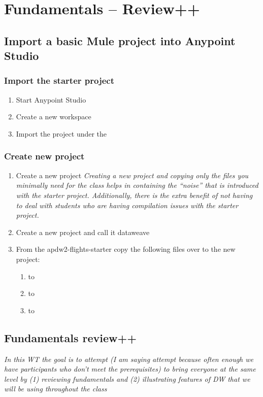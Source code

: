 \chapter{Fundamentals -- Review++}
\section{Import a basic Mule project into Anypoint Studio}
\subsection{Import the starter project}
\begin{enumerate}
\item Start Anypoint Studio
\item Create a new workspace
\item Import the  project under the 
\end{enumerate}
\subsection{Create new project}
\begin{enumerate}[resume*]
\item Create a new project
  \newline
  \emph{
    Creating a new project and copying only the files you minimally need for the class helps in containing the ``noise'' that is introduced with the starter project.  Additionally, there is the extra benefit of not having to deal with students who are having compilation issues with the starter project.
  }
\item Create a new project and call it dataweave
\item From the apdw2-flights-starter copy the following files over to the new project:
  \begin{enumerate}
  \item {} to 
  \item {} to 
  \item {} to 
  \end{enumerate}
\end{enumerate}

\section{Fundamentals review++}
\emph{
  In this WT the goal is to attempt (I am saying attempt because often enough we have participants who don’t meet the prerequisites) to bring everyone at the same level by (1) reviewing fundamentals and (2) illustrating features of DW that we will be using throughout the class
}

